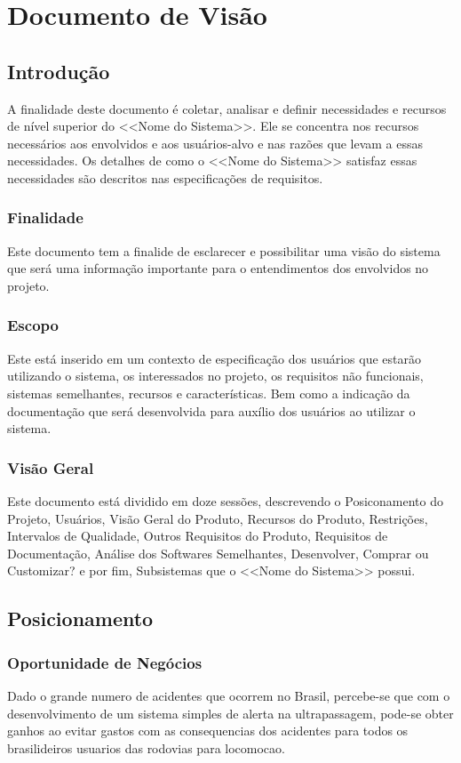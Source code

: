 \chapter[Documento de Visão]{Documento de Visão}

\section{Introdução}
A finalidade deste documento é coletar, analisar e definir necessidades e recursos de nível superior do <<Nome do Sistema>>. Ele se concentra nos recursos necessários aos envolvidos e aos usuários-alvo e nas razões que levam a essas necessidades. Os detalhes de como o <<Nome do Sistema>> satisfaz essas necessidades são descritos nas especificações de requisitos.

\subsection{Finalidade}
Este documento tem a finalide de  esclarecer e possibilitar uma visão do sistema que será uma informação importante para o entendimentos dos envolvidos no projeto.
\subsection{Escopo}
Este está inserido em um contexto de especificação dos usuários que estarão utilizando o sistema, os interessados no projeto, os requisitos não funcionais, sistemas semelhantes, recursos e características. Bem como a indicação da documentação que será desenvolvida para auxílio dos usuários ao utilizar o sistema.
\subsection{Visão Geral}
Este documento está dividido em doze sessões, descrevendo o Posiconamento do Projeto, Usuários, Visão Geral do Produto, Recursos do Produto, Restrições, Intervalos de Qualidade, Outros Requisitos do Produto, Requisitos de Documentação, Análise dos Softwares Semelhantes, Desenvolver, Comprar ou Customizar? e por fim, Subsistemas que o <<Nome do Sistema>> possui.


\section{Posicionamento}

\subsection{Oportunidade de Negócios}
Dado o grande numero de acidentes que ocorrem no Brasil, percebe-se que com o desenvolvimento de um sistema simples de alerta na ultrapassagem, pode-se obter ganhos ao evitar gastos com as consequencias dos acidentes para todos os brasilideiros usuarios das rodovias para locomocao.


